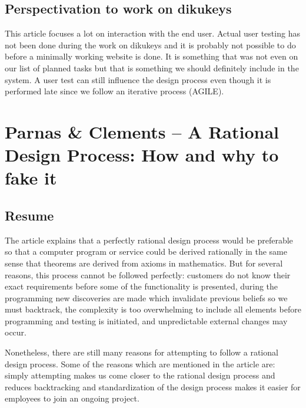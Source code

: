 \documentclass[11pt,a4paper]{report}
\begin{document}
\subsection{Perspectivation to work on dikukeys}
This article focuses a lot on interaction with the end user. Actual user testing has not been done during the work on dikukeys and it is probably not possible to do before a minimally working website is done. It is something that was not even on our list of planned tasks but that is something we should definitely include in the system. A user test can still influence the design process even though it is performed late since we follow an iterative process (AGILE). 

\section{Parnas \& Clements -- A Rational Design Process: How and why to
fake it}
\subsection{Resume}
The article explains that a perfectly rational design process would be preferable so that a computer program or service could be derived rationally in the same sense that theorems are derived from axioms in mathematics. But for several reasons, this process cannot be followed perfectly: customers do not know their exact requirements before some of the functionality is presented, during the programming new discoveries are made which invalidate previous beliefs so we must backtrack, the complexity is too overwhelming to include all elements before programming and testing is initiated, and unpredictable external changes may occur.

Nonetheless, there are still many reasons for attempting to follow a rational design process. Some of the reasons which are mentioned in the article are: simply attempting makes us come closer to the rational design process and reduces backtracking and standardization of the design process makes it easier for employees to join an ongoing project.
\end{document}
